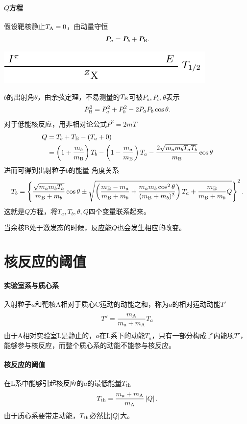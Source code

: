 \paragraph{$Q$方程}假设靶核静止$T_{\mathrm{A}}=0$，由动量守恒
\[
	\bm P_a=\bm P_b+\bm P_{\mathrm{B}}.
\]
\begin{center}
	\includegraphics[page=8]{figures/tikz/layouts.pdf}
\end{center}
$b$的出射角$\theta$，由余弦定理，不易测量的$T_{\mathrm{B}}$可被$P_a,P_b,\theta$表示
\[
	P_{\mathrm{B}}^2=P_a^2+P_b^2-2P_aP_b\cos\theta.
\]
对于低能核反应，用非相对论公式$P^2=2mT$
\begin{align}\notag
	Q&=T_b+T_{\mathrm{B}}-(T_a+0)\\
	&=\left(1+\frac{m_b}{m_{\mathrm{B}}}\right)T_b-\left(1-\frac{m_a}{m_{\mathrm{B}}}\right)T_a-\frac{2\sqrt{m_am_bT_aT_b}}{m_{\mathrm{B}}}\cos\theta
\end{align}
进而可得到出射粒子$b$的能量-角度关系
\begin{align}
	T_b=\left\{\frac{\sqrt{m_am_bT_a}}{m_{\mathrm{B}}+m_b}\cos\theta\pm\sqrt{\left(\frac{m_{\mathrm{B}}-m_a}{m_{\mathrm{B}}+m_b}+\frac{m_am_b\cos^2\theta}{(m_{\mathrm{B}}+m_b)^2}\right)T_a+\frac{m_{\mathrm{B}}}{m_{\mathrm{B}}+m_b}Q}\right\}^2.
\end{align}
这就是$Q$方程，将$T_a,T_b,\theta,Q$四个变量联系起来。

当余核B处于激发态的时候，反应能$Q$也会发生相应的改变。

\section{核反应的阈值}
\paragraph{实验室系与质心系}
入射粒子$a$和靶核A相对于质心C运动的动能之和，称为$a$的相对运动动能$T'$
\begin{align}
	T'=\frac{m_{\mathrm{A}}}{m_a+m_{\mathrm{A}}}T_a
\end{align}
由于A相对实验室L是静止的，$a$在L系下的动能$T_a$，只有一部分构成了内能项$T'$，能够参与核反应，而整个质心系的动能不能参与核反应。

\paragraph{核反应的阈值}
在L系中能够引起核反应的$a$的最低能量$T_{\mathrm{th}}$
\begin{align}
	T_{\mathrm{th}}=\frac{m_a+m_{\mathrm{A}}}{m_{\mathrm{A}}}\left\lvert Q\right\rvert.
\end{align}
由于质心系要带走动能，$T_{\mathrm{th}}$必然比$\left\lvert Q\right\rvert$大。
